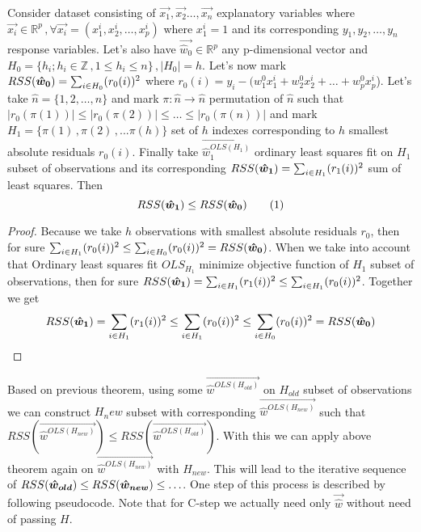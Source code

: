 \begin{theorem}
Consider dataset consisting of
$\vec{x_1}, \vec{x_2} \ldots,\vec{x_n}$ explanatory variables where 
$\vec{x_i}\in\mathbb{R}^p\,, \forall \vec{x_i} = (x^i_1, x^i_2,\ldots,x^i_p)$ where $x^i_1 = 1$
and its corresponding $y_1, y_2,\ldots,y_n$ response variables. 
Let's also have $\vec{\hat{w}_0}\in\mathbb{R}^p$ any p-dimensional vector and 
$H_0 = \{{h_i ; h_i \in\mathbb{Z}\,, 1 \leq h_i \leq n\}}\,, |H_0| = h$. 
Let's now mark $RSS(\boldsymbol{\hat{w}_0}) = \sum_{i\in H_0} (r_0(i))^2$ where 
$r_0(i) = y_i - (w_1^0x^i_1 + w_2^0x^i_2 +\ldots+ w_p^0x^i_p$).
Let's take $\hat{n} = \{{1,2,\ldots,n\}}$ and mark
$\pi: \hat{n} \rightarrow \hat{n}$ permutation of $\hat{n}$ such that $|r_0({\pi(1)})| \leq |r_0({\pi(2)})| \leq \ldots \leq |r_0({\pi(n)})|$
and mark $H_1 = \{{\pi(1)\,, \pi(2)\,,... \pi(h)\}}$ set of $h$ indexes corresponding to $h$ smallest absolute residuals $r_0(i)$.
Finally take $\vec{\hat{w}^{OLS(H_1)}_1 }$ ordinary least squares fit on $H_1$ subset of observations
and its corresponding $RSS(\boldsymbol{\hat{w}_1}) = \sum_{i\in H_1} (r_1(i))^2$ sum of least squares. Then
\[ 
	RSS(\what{1}) \leq RSS(\what{0}) \numberthis
\]
\end{theorem}

\begin{proof}
	Because we take $h$ observations with smallest absolute residuals $r_0$, then for sure $\sum_{i\in H_1} (r_0(i))^2 \leq \sum_{i\in H_0} (r_0(i))^2 =  RSS(\boldsymbol{\hat{w}_0})$.
	When we take into account that Ordinary least squares fit $OLS_{H_1}$ minimize objective function of 
	$H_1$ subset of observations, then for sure  $RSS(\boldsymbol{\hat{w}_1}) =  \sum_{i\in H_1} (r_1(i))^2 \leq \sum_{i\in H_1} (r_0(i))^2$.
	Together we get $$RSS(\boldsymbol{\hat{w}_1})=\sum_{i\in H_1}(r_1(i))^2\leq\sum_{i\in H_1}(r_0(i))^2\leq\sum_{i\in H_0}(r_0(i))^2=RSS(\boldsymbol{\hat{w}_0})$$
\end{proof}


\begin{corollary} 
	Based on previous theorem, using some $\vec{\hat{w}^{OLS(H_{old})}}$  on $H_{old}$ subset of observations we can
	construct $H_new$ subset with corresponding $\vec{\hat{w}^{OLS(H_{new})}}$ such that $RSS(\vec{\hat{w}^{OLS(H_{new})}}) \leq RSS(\vec{\hat{w}^{OLS(H_{old})}})$. 
	With this we can apply above theorem again on $\vec{\hat{w}^{OLS(H_{new})}}$ with $H_{new}$. This will lead to the iterative sequence of
	$RSS(\boldsymbol{\hat{w}_{old}}) \leq RSS(\boldsymbol{\hat{w}_{new}}) \leq \ldots$. One step of this process is described by following pseudocode. Note that for C-step we actually need only $\vec{\hat{w}}$ 
	 without need of passing  $H$.
\end{corollary}

